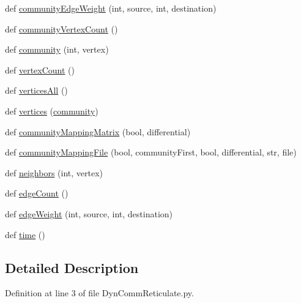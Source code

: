 \begin{DoxyCompactItemize}
def \hyperlink{classDynCommReticulate_1_1DynCommReticulate_a6d8d0cb115e3993240fea4f5f3af17fd}{community\+Edge\+Weight} (int, source, int, destination)
\item 
def \hyperlink{classDynCommReticulate_1_1DynCommReticulate_ae3cb0062b95b314809dc07267fba6cf7}{community\+Vertex\+Count} ()
\item 
def \hyperlink{classDynCommReticulate_1_1DynCommReticulate_a074fd63ac9e9bb725a1e332ebf75dd56}{community} (int, vertex)
\item 
def \hyperlink{classDynCommReticulate_1_1DynCommReticulate_a4f7ba98ff244b19838154e5c02d6289e}{vertex\+Count} ()
\item 
def \hyperlink{classDynCommReticulate_1_1DynCommReticulate_ad09ca5295a25f2c5246c56c39ef13bfc}{vertices\+All} ()
\item 
def \hyperlink{classDynCommReticulate_1_1DynCommReticulate_ab8c90f44f7428518072a0a69f5684f29}{vertices} (\hyperlink{classDynCommReticulate_1_1DynCommReticulate_a074fd63ac9e9bb725a1e332ebf75dd56}{community})
\item 
def \hyperlink{classDynCommReticulate_1_1DynCommReticulate_a3ad2811014dfadff286d26ac73508b05}{community\+Mapping\+Matrix} (bool, differential)
\item 
def \hyperlink{classDynCommReticulate_1_1DynCommReticulate_a09b0ee0b3c16b21cc3079f24b2feaf8a}{community\+Mapping\+File} (bool, community\+First, bool, differential, str, file)
\item 
def \hyperlink{classDynCommReticulate_1_1DynCommReticulate_a0c93ff179f8d4931c23ddb13af7452ef}{neighbors} (int, vertex)
\item 
def \hyperlink{classDynCommReticulate_1_1DynCommReticulate_a3d9e08c8813197eb3b4ba6a7221d0628}{edge\+Count} ()
\item 
def \hyperlink{classDynCommReticulate_1_1DynCommReticulate_a0eff7bd13457067e5f46a7ce1969119b}{edge\+Weight} (int, source, int, destination)
\item 
def \hyperlink{classDynCommReticulate_1_1DynCommReticulate_aab6a6a4ffde47f3c143de304a2116584}{time} ()
\end{DoxyCompactItemize}


\subsection{Detailed Description}


Definition at line 3 of file Dyn\+Comm\+Reticulate.\+py.



